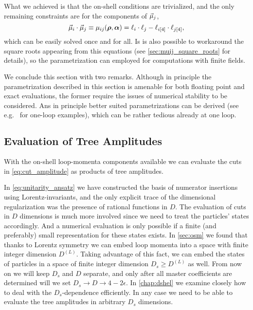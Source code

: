 What we achieved is that the on-shell conditions are trivialized,
and the only remaining constraints are for the components of $\va{\mu}_j$,
\begin{equation}
  \va{\mu}_i \cdot \va{\mu}_j  \equiv  \mu_{ij} (\vb*{\rho},\vb*{\alpha}) = \ell_i\cdot \ell_j - \ell_{i[4]}\cdot \ell_{j[4]},
\end{equation}
which can be easily solved once and for all.
Is is also possible to workaround the square roots appearing from this equations (see \cref{sec:muij_square_roots} for details),
so the parametrization can employed for computations with finite fields.

We conclude this section with two remarks.
Although in principle the parametrization described in this
section is amenable for both floating point and exact evaluations,
the former require the issues of numerical stability to be considered.
Ans in principle better suited parametrizations can be derived (see e.g.\ \cite{Kilgore:2007qr,Berger:2008sj} for one-loop examples),
which can be rather tedious already at one loop.

\subsection{Evaluation of Tree Amplitudes}

With the on-shell loop-momenta components available
we can evaluate the cuts in \cref{eq:cut_amplitude} as products
of tree amplitudes.

In \cref{eq:unitarity_ansatz} we have constructed  the basis of numerator insertions using Lorentz-invariants, and
the only explicit trace of the dimensional regularization was the presence of rational functions in $D$.
The evaluation of cuts in $D$ dimensions is much more involved since we need to treat the particles' states accordingly.
And a numerical evaluation is only possible if a finite (and preferably) small representation for these states exists.
In \cref{sec:osm} we found that thanks to Lorentz symmetry we can embed loop
momenta into a space with finite integer dimension $D^{(L)}$.
Taking advantage of this fact, we can embed the states of particles in a space of finite integer dimension $D_s\geq D^{(L)}$ as well.
From now on we will keep $D_s$ and $D$ separate,
and only after all master coefficients are determined will we set $D_s\to D\to 4-2\epsilon$.
In \cref{chap:dshel} we examine closely how to deal with the $D_s$-dependence efficiently.
In any case we need to be able to evaluate the tree amplitudes in arbitrary $D_s$ dimensions.

